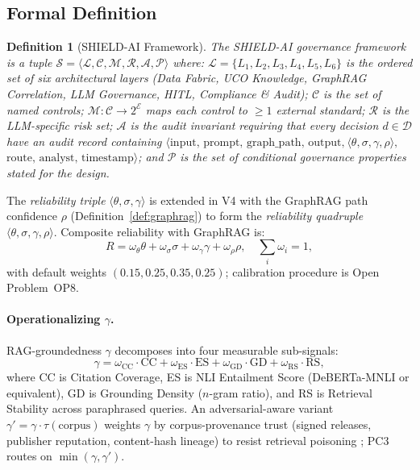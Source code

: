 \documentclass[journal]{IEEEtran}
\newtheorem{definition}{Definition}
\begin{document}
\subsection{Formal Definition}

\begin{definition}[SHIELD-AI Framework]
\label{def:framework}
The SHIELD-AI governance framework is a tuple
$\mathcal{S} = \langle \mathcal{L}, \mathcal{C}, \mathcal{M}, \mathcal{R}, \mathcal{A}, \mathcal{P} \rangle$
where:
$\mathcal{L} = \{L_1, L_2, L_3, L_4, L_5, L_6\}$ is the ordered set of six architectural
layers (Data Fabric, UCO Knowledge, GraphRAG Correlation, LLM Governance, HITL, Compliance \&
Audit);
$\mathcal{C}$ is the set of named controls;
$\mathcal{M}: \mathcal{C} \to 2^{\mathcal{E}}$ maps each control to $\geq 1$ external standard;
$\mathcal{R}$ is the LLM-specific risk set;
$\mathcal{A}$ is the audit invariant requiring that every decision $d \in \mathcal{D}$ have an
audit record containing
$\langle \text{input, prompt, graph\_path, output,}\ \langle\theta, \sigma, \gamma, \rho\rangle,$
$\text{route, analyst, timestamp}\rangle$;
and $\mathcal{P}$ is the set of conditional governance properties stated for the design.
\end{definition}

The \emph{reliability triple} $\langle\theta, \sigma, \gamma\rangle$ is extended in V4 with
the GraphRAG path confidence $\rho$ (Definition~\ref{def:graphrag}) to form the
\emph{reliability quadruple} $\langle\theta, \sigma, \gamma, \rho\rangle$.
Composite reliability with GraphRAG is:
\begin{equation}
R = \omega_\theta\theta + \omega_\sigma\sigma + \omega_\gamma\gamma + \omega_\rho\rho,
\quad \sum_i \omega_i = 1,
\label{eq:R_v4}
\end{equation}
with default weights $(0.15, 0.25, 0.35, 0.25)$; calibration procedure is Open Problem~OP8.

\paragraph{Operationalizing $\gamma$.}
RAG-groundedness $\gamma$ decomposes into four measurable sub-signals:
\begin{equation}
\gamma = \omega_{\text{CC}}\cdot\text{CC} + \omega_{\text{ES}}\cdot\text{ES}
        + \omega_{\text{GD}}\cdot\text{GD} + \omega_{\text{RS}}\cdot\text{RS},
\label{eq:gamma}
\end{equation}
where CC is Citation Coverage, ES is NLI Entailment Score (DeBERTa-MNLI or equivalent),
GD is Grounding Density ($n$-gram ratio), and RS is Retrieval Stability across paraphrased
queries. An adversarial-aware variant $\gamma' = \gamma \cdot \tau(\text{corpus})$ weights
$\gamma$ by corpus-provenance trust (signed releases, publisher reputation, content-hash
lineage) to resist retrieval poisoning \cite{greshake2023indirect}; PC3 routes on
$\min(\gamma, \gamma')$.
\end{document}
